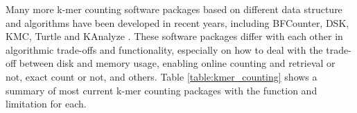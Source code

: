 Many more k-mer counting software packages based on different data structure
and algorithms have been developed in recent years, including BFCounter, DSK, 
KMC, Turtle and KAnalyze \cite{Melsted2011, Rizk2013, Deorowicz2013, Roy2014, 
Audano2014}. These software packages differ with each other in algorithmic
trade-offs and functionality, especially on how to deal with the trade-off
between disk and memory usage, enabling online counting and retrieval or not,
exact count or not, and others. 
Table \ref{table:kmer_counting} shows a summary of most current k-mer counting
packages with the function and limitation for each.


%


